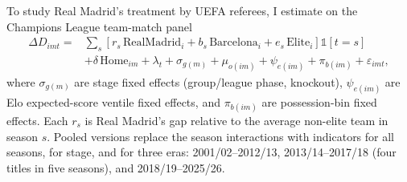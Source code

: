 To study Real Madrid's treatment by UEFA referees, I estimate on the Champions League team-match panel
\begin{equation}\label{eq:rmucl}
\begin{split}
\Delta D_{imt} = {} & \sum_{s} \left[r_s\, \text{RealMadrid}_i + b_s\, \text{Barcelona}_i + e_s\, \text{Elite}_i\right] \mathbb{1}[t=s] \\
& + \delta\, \text{Home}_{im} + \lambda_t + \sigma_{g(m)} + \mu_{o(im)} + \psi_{e(im)} + \pi_{b(im)} + \varepsilon_{imt},
\end{split}
\end{equation}
where $\sigma_{g(m)}$ are stage fixed effects (group/league phase, knockout), $\psi_{e(im)}$ are Elo expected-score ventile fixed effects, and $\pi_{b(im)}$ are possession-bin fixed effects. Each $r_s$ is Real Madrid's gap relative to the average non-elite team in season $s$. Pooled versions replace the season interactions with indicators for all seasons, for stage, and for three eras: 2001/02--2012/13, 2013/14--2017/18 (four titles in five seasons), and 2018/19--2025/26.

